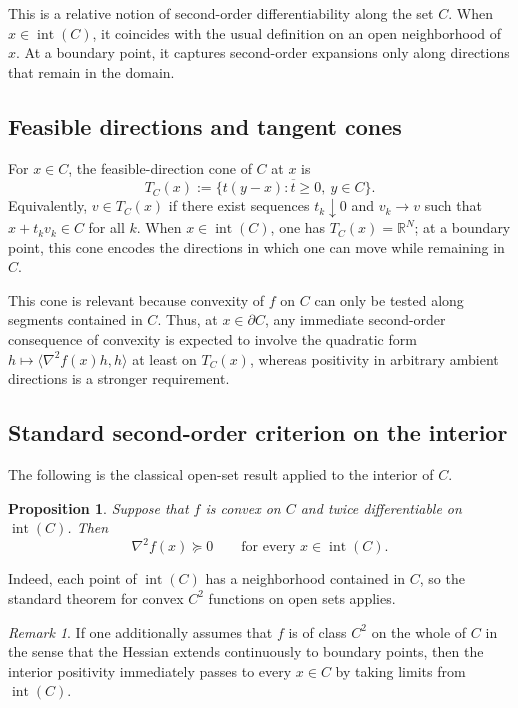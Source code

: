 \documentclass[11pt]{article}
\newtheorem{proposition}{Proposition}
\theoremstyle{remark}
\newtheorem{remark}{Remark}
\newcommand{\R}{\mathbb{R}}
\newcommand{\inner}[2]{\langle #1,#2\rangle}
\begin{document}
This is a relative notion of second-order differentiability along the set $C$.
When $x \in \operatorname{int}(C)$, it coincides with the usual definition on an
open neighborhood of $x$. At a boundary point, it captures second-order
expansions only along directions that remain in the domain.

\subsection{Feasible directions and tangent cones}

For $x \in C$, the feasible-direction cone of $C$ at $x$ is
\[
T_C(x):=\overline{\{t(y-x): t \geq 0,\ y \in C\}}.
\]
Equivalently, $v \in T_C(x)$ if there exist sequences $t_k \downarrow 0$ and
$v_k \to v$ such that $x+t_k v_k \in C$ for all $k$. When $x \in
\operatorname{int}(C)$, one has $T_C(x)=\R^N$; at a boundary point, this cone
encodes the directions in which one can move while remaining in $C$.

This cone is relevant because convexity of $f$ on $C$ can only be tested along
segments contained in $C$. Thus, at $x \in \partial C$, any immediate
second-order consequence of convexity is expected to involve the quadratic form
$h \mapsto \inner{\nabla^2 f(x)h}{h}$ at least on $T_C(x)$, whereas positivity in
arbitrary ambient directions is a stronger requirement.

\subsection{Standard second-order criterion on the interior}

The following is the classical open-set result applied to the interior of $C$.

\begin{proposition}
Suppose that $f$ is convex on $C$ and twice differentiable on
$\operatorname{int}(C)$. Then
\[
\nabla^2 f(x) \succeq 0 \qquad \text{for every } x \in \operatorname{int}(C).
\]
\end{proposition}

Indeed, each point of $\operatorname{int}(C)$ has a neighborhood contained in
$C$, so the standard theorem for convex $C^2$ functions on open sets applies.

\begin{remark}
If one additionally assumes that $f$ is of class $C^2$ on the whole of $C$ in
the sense that the Hessian extends continuously to boundary points, then the
interior positivity immediately passes to every $x \in C$ by taking limits from
$\operatorname{int}(C)$.
\end{remark}
\end{document}
